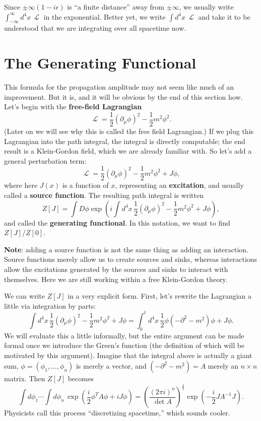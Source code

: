 \documentclass{report}
\theoremstyle{plain}
\theoremstyle{definition}
\theoremstyle{remark}
\DeclareMathOperator{\cL}{\mathcal{L}}
\begin{document}
Since $\pm \infty(1 - i\epsilon)$ is ``a finite distance'' away from
$\pm \infty$, we usually write $\int_{-\infty}^\infty d^4x \, \cL$ in
the exponential. Better yet, we write $\int d^4x \, \cL$ and take it
to be understood that we are integrating over all spacetime now.

\section{The Generating Functional}

This formula for the propagation amplitude may not seem like much of
an improvement. But it is, and it will be obvious by the end of this
section how. Let's begin with the {\bf free-field Lagrangian}
$$ \cL = \frac{1}{2} (\partial_\mu \phi)^2 - \frac{1}{2} m^2\phi^2. $$
(Later on we will see why this is called the free field Lagrangian.)
If we plug this Lagrangian into the path integral, the integral is
directly computable; the end result is a Klein-Gordon field, which we
are already familiar with. So let's add a general perturbation term:
$$ \cL = \frac{1}{2} (\partial_\mu\phi)^2 - \frac{1}{2} m^2\phi^2 + J\phi, $$
where here $J(x)$ is a function of $x$, representing an {\bf
  excitation}, and usually called a {\bf source function}. The
resulting path integral is written
$$ Z[J] = \int D\phi \exp\left(i \int d^4x \, \frac{1}{2} (\partial_\mu \phi)^2 - \frac{1}{2}m^2\phi^2 + J\phi\right), $$
and called the {\bf generating functional}. In this notation, we want
to find $Z[J]/Z[0]$.

{\bf Note}: adding a source function is not the same thing as adding
an interaction. Source functions merely allow us to create sources and
sinks, whereas interactions allow the excitations generated by the
sources and sinks to interact with themselves. Here we are still
working within a free Klein-Gordon theory.

We can write $Z[J]$ in a very explicit form. First, let's rewrite the
Lagrangian a little via integration by parts:
$$ \int d^4x \, \frac{1}{2} (\partial_\mu \phi)^2 - \frac{1}{2} m^2\phi^2 + J\phi = \int_0^t d^4x \, \frac{1}{2} \phi(-\partial^2 - m^2)\phi + J\phi. $$
We will evaluate this a little informally, but the entire argument can
be made formal once we introduce the Green's function (the definition
of which will be motivated by this argument). Imagine that the
integral above is actually a giant sum,
$\phi = (\phi_1, \ldots, \phi_n)$ is merely a vector, and
$(-\partial^2 - m^2) = A$ merely an $n \times n$ matrix. Then $Z[J]$
becomes
$$ \int d\phi_1 \cdots \int d\phi_n \, \exp\left(\frac{i}{2} \phi^T A \phi + iJ\phi\right) = \left(\frac{(2\pi i)^n}{\det A}\right)^{\frac{1}{2}} \exp\left(-\frac{i}{2} JA^{-1}J\right). $$
Physicists call this process ``discretizing spacetime,'' which sounds
cooler.
\end{document}
